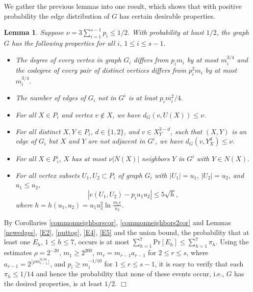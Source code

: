 \documentclass[11pt]{article}
\newtheorem{lemma}{Lemma}[section]
\newenvironment{proof}
      {\medskip\noindent{\bf Proof:}\hspace{1mm}}
      {\hfill$\Box$\medskip}
\begin{document}
We gather the previous lemmas into one result, which shows that with positive
probability the edge distribution of $G$ has certain desirable properties.

\begin{lemma} \label{importantstep}
Suppose $\nu=3\sum_{i=1}^{s-1}p_i \leq 1/2$. With probability at least $1/2$,
the graph $G$ has the following properties for all $i$, $1 \leq i \leq s-1$.
\begin{itemize}
\item The degree of every vertex in graph $G_i$ differs from $p_im_i$ by at
most $m_i^{3/4}$ and the codegree of
every pair of distinct vertices differs from $p_i^2m_i$ by at most $m_i^{3/4}$.
\item The number of edges of $G_i$ not in $G^i$ is at
least $p_im_i^2/4$.
\item For all $X \in P_i$ and vertex $v \not \in X$, we have $d_G(v,U(X)) \leq
\nu$.
\item For all distinct $X,Y \in P_i$, $d \in \{1,2\}$, and $v \in X^{3-d}_Y$,
such that $(X,Y)$ is an edge of $G_i$ but $X$ and $Y$ are not adjacent in
$G^i$, we have $d_{G}(v,Y^d_X) \leq \nu$.
\item For all $X \in P_i$, $X$ has at most $\nu |N(X)|$ neighbors $Y$ in $G^i$ with $Y \in N(X)$.
\item For all vertex subsets $U_1,U_2 \subset P_i$ of graph $G_i$ with
$|U_1|=u_1$, $|U_2|=u_2$, and $u_1 \leq u_2$,
\begin{equation*}\label{discre} |e(U_1,U_2)-p_iu_1u_2| \leq
5\sqrt{h},\end{equation*}
where  $h=h(u_1,u_2)=u_1u_2^2\ln \frac{m_ie}{u_2}$.
\end{itemize}
\end{lemma}
\begin{proof}
By Corollaries \ref {commonneighborscor}, \ref{commonneighbors2cor} and Lemmas
\ref{newedges}, \ref{E2}, \ref{puttog}, \ref{E4}, \ref{E5} and the union bound,
the probability that at least one $E_h$, $1 \leq h \leq 7$, occurs is at most
$\sum_{h=1}^7 \textrm{Pr}[E_h] \leq \sum_{h=1}^7 \pi_h.$ Using the estimates
$\rho=2^{-20}$, $m_1 \geq 2^{200}$, $m_r=m_{r-1}a_{r-1}$ for $2 \leq r \leq s$,
where $a_{r-1}=2^{\lfloor \rho m_{r-1}^{9/10}\rfloor}$, and $p_i \geq
m_i^{-1/10}$ for $1 \leq r \leq s-1$, it is easy to verify that each $\pi_h
\leq 1/14$ and hence the probability that none of these events occur, i.e., $G$
has the desired properties, is at least $1/2$.
\end{proof}
\end{document}

